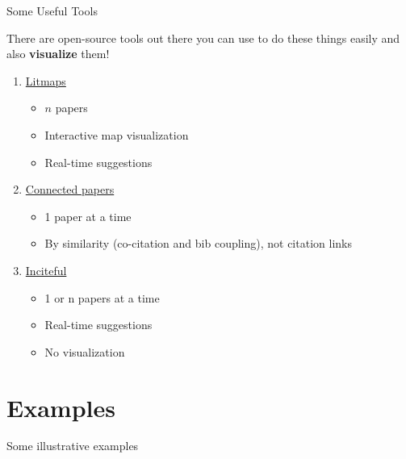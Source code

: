 \documentclass[aspectratio=43]{beamer}
\begin{document}
\begin{frame}{Some Useful Tools}    

There are open-source tools out there you can use to do these things easily and also \textbf{visualize} them!

    \begin{enumerate}
        \item \href{https://www.litmaps.co}{Litmaps}
        \begin{itemize}
            \item $n$ papers
         \item Interactive map visualization
         \item Real-time suggestions
        \end{itemize}
    \item     \href{https://www.connectedpapers.com}{Connected papers}
         \begin{itemize}
             \item 1 paper at a time 
             \item By similarity (co-citation and bib coupling), not citation links
         \end{itemize}
    \item     \href{https://inciteful.xyz}{Inciteful}
        \begin{itemize}
            \item 1 or n papers at a time
            \item Real-time suggestions
            \item No visualization 
        \end{itemize}
    
    \end{enumerate}
\end{frame}

\section{Examples}

\begin{transitionframe}
Some illustrative examples
\end{transitionframe}
\end{document}
